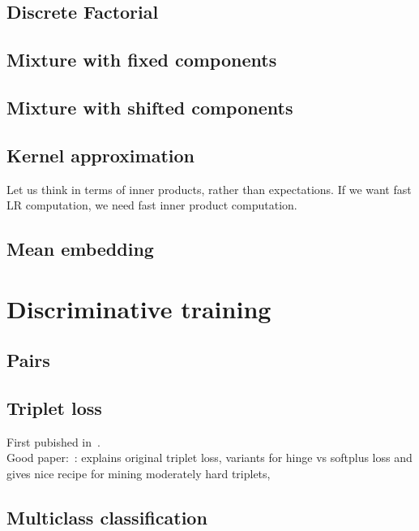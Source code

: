 \documentclass[a4paper,oneside,12pt,english]{report}
\begin{document}
 


\section{Discrete Factorial}

\section{Mixture with fixed components}

\section{Mixture with shifted components}


\section{Kernel approximation}
Let us think in terms of inner products, rather than expectations. If we want fast LR computation, we need fast inner product computation. 



\section{Mean embedding}



\chapter{Discriminative training}
\section{Pairs}

\section{Triplet loss}
First pubished in~\cite{Facenet}.\\

\noindent Good paper:~\cite{Defense_Triplet}: explains original triplet loss, variants for hinge vs softplus loss and gives nice recipe for mining moderately hard triplets,

\section{Multiclass classification}
\cite{DSIS17,LIMSI_Language_embedding}
\end{document}
